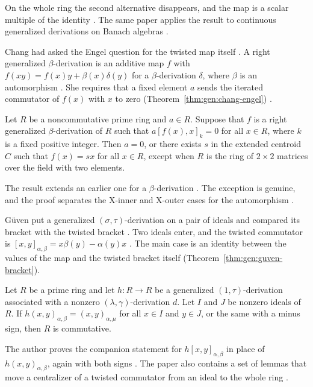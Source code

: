 On the whole ring the second alternative disappears, and the map is a scalar
multiple of the identity \cite[Theorem~1.2, p.~2]{DharaAliDas2016}. The same paper
applies the result to continuous generalized derivations on Banach algebras
\cite[p.~2]{DharaAliDas2016}.

Chang had asked the Engel question for the twisted map itself
\cite[p.~1641]{Chang2008}. A right generalized $\beta$-derivation is an additive
map $f$ with $f(xy)=f(x)y+\beta(x)\delta(y)$ for a $\beta$-derivation $\delta$,
where $\beta$ is an automorphism \cite[p.~1641]{Chang2008}. She requires that a
fixed element $a$ sends the iterated commutator of $f(x)$ with $x$ to zero (Theorem~\ref{thm:gen:chang-engel})
\cite[p.~1641]{Chang2008}.\begin{theorem}\label{thm:gen:chang-engel}
Let $R$ be a noncommutative prime ring and $a\in R$. Suppose that $f$ is a right
generalized $\beta$-derivation of $R$ such that $a[f(x),x]_{k}=0$ for all $x\in R$,
where $k$ is a fixed positive integer. Then $a=0$, or there exists $s$ in the
extended centroid $C$ such that $f(x)=sx$ for all $x\in R$, except when $R$ is the
ring of $2\times2$ matrices over the field with two elements.
\end{theorem}

The result extends an earlier one for a $\beta$-derivation
\cite[p.~1641]{Chang2008}. The exception is genuine, and the proof separates the
X-inner and X-outer cases for the automorphism \cite[p.~1647]{Chang2008}.

G\"uven put a generalized $(\sigma,\tau)$-derivation on a pair of ideals and
compared its bracket with the twisted bracket
\cite[p.~1]{Guven2013}. Two ideals enter, and the twisted commutator is
$[x,y]_{\alpha,\beta}=x\beta(y)-\alpha(y)x$
\cite[p.~1]{Guven2013}. The main case is an identity between the values of the
map and the twisted bracket itself (Theorem~\ref{thm:gen:guven-bracket}).

\begin{theorem}\label{thm:gen:guven-bracket}
Let $R$ be a prime ring and let $h\colon R\to R$ be a generalized
$(1,\tau)$-derivation associated with a nonzero $(\lambda,\gamma)$-derivation $d$.
Let $I$ and $J$ be nonzero ideals of $R$. If $h(x,y)_{\alpha,\beta}=(x,y)_{\alpha,\mu}$
for all $x\in I$ and $y\in J$, or the same with a minus sign, then $R$ is
commutative.
\end{theorem}

The author proves the companion statement for $h[x,y]_{\alpha,\beta}$ in place of
$h(x,y)_{\alpha,\beta}$, again with both signs
\cite[p.~1]{Guven2013}. The paper also contains a set of lemmas that move a
centralizer of a twisted commutator from an ideal to the whole ring
\cite[Theorem~1, p.~3]{Guven2013}.


